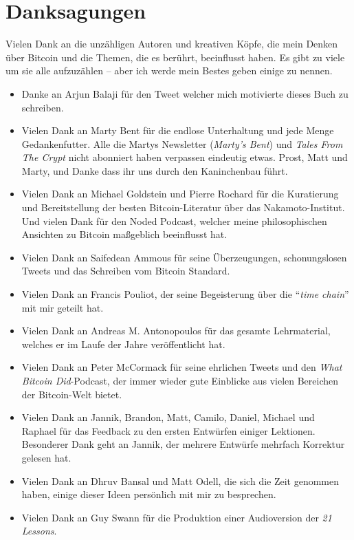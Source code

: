 \chapter*{Danksagungen}

Vielen Dank an die unzähligen Autoren und kreativen Köpfe, die mein Denken über
Bitcoin und die Themen, die es berührt, beeinflusst haben. Es gibt zu viele um
sie alle aufzuzählen -- aber ich werde mein Bestes geben einige zu nennen.

\begin{itemize}
  \item Danke an Arjun Balaji für den Tweet welcher mich motivierte dieses Buch zu schreiben.
  \item Vielen Dank an Marty Bent für die endlose Unterhaltung und jede Menge Gedankenfutter. Alle die Martys Newsletter (\textit{Marty's Bent}) und \textit{Tales From The Crypt} nicht abonniert haben verpassen eindeutig etwas. Prost, Matt und Marty, und Danke dass ihr uns durch den Kaninchenbau führt.
  \item Vielen Dank an Michael Goldstein und Pierre Rochard für die Kuratierung und Bereitstellung der besten Bitcoin-Literatur über das Nakamoto-Institut. Und vielen Dank für den Noded Podcast, welcher meine philosophischen Ansichten zu Bitcoin maßgeblich beeinflusst hat.
  \item Vielen Dank an Saifedean Ammous für seine Überzeugungen, schonungslosen Tweets und das Schreiben vom Bitcoin Standard.
  \item Vielen Dank an Francis Pouliot, der seine Begeisterung über die \enquote{\textit{time chain}} mit mir geteilt hat.
  \item Vielen Dank an Andreas M. Antonopoulos für das gesamte Lehrmaterial, welches er im Laufe der Jahre veröffentlicht hat.
  \item Vielen Dank an Peter McCormack für seine ehrlichen Tweets und den \textit{What Bitcoin Did}-Podcast, der immer wieder gute Einblicke aus vielen Bereichen der Bitcoin-Welt bietet.
  \item Vielen Dank an Jannik, Brandon, Matt, Camilo, Daniel, Michael und Raphael für das Feedback zu den ersten Entwürfen einiger Lektionen. Besonderer Dank geht an Jannik, der mehrere Entwürfe mehrfach Korrektur gelesen hat.
  \item Vielen Dank an Dhruv Bansal und Matt Odell, die sich die Zeit genommen haben, einige dieser Ideen persönlich mit mir zu besprechen.
  \item Vielen Dank an Guy Swann für die Produktion einer Audioversion der \textit{21 Lessons}.

\end{itemize}
